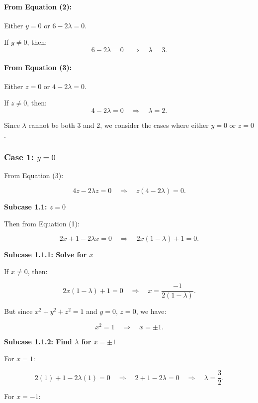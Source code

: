 \documentclass[11pt]{article}
\begin{document}
\paragraph{From Equation (2):}

Either \( y = 0 \) or \( 6 - 2\lambda = 0 \).

If \( y \neq 0 \), then:
\[
6 - 2\lambda = 0 \quad \Rightarrow \quad \lambda = 3.
\]

\paragraph{From Equation (3):}

Either \( z = 0 \) or \( 4 - 2\lambda = 0 \).

If \( z \neq 0 \), then:
\[
4 - 2\lambda = 0 \quad \Rightarrow \quad \lambda = 2.
\]

Since \( \lambda \) cannot be both 3 and 2, we consider the cases where either \( y = 0 \) or \( z = 0 \).

\newpage

\subsubsection{Case 1: \( y = 0 \)}

From Equation (3):

\[
4z - 2\lambda z = 0 \quad \Rightarrow \quad z (4 - 2\lambda) = 0.
\]

\textbf{Subcase 1.1: \( z = 0 \)}

Then from Equation (1):

\[
2x + 1 - 2\lambda x = 0 \quad \Rightarrow \quad 2x (1 - \lambda) + 1 = 0.
\]

\textbf{Subcase 1.1.1: Solve for \( x \)}

If \( x \neq 0 \), then:

\[
2x (1 - \lambda) + 1 = 0 \quad \Rightarrow \quad x = \frac{-1}{2(1 - \lambda)}.
\]

But since \( x^2 + y^2 + z^2 = 1 \) and \( y = 0 \), \( z = 0 \), we have:

\[
x^2 = 1 \quad \Rightarrow \quad x = \pm 1.
\]

\textbf{Subcase 1.1.2: Find \( \lambda \) for \( x = \pm 1 \)}

For \( x = 1 \):

\[
2(1) + 1 - 2\lambda (1) = 0 \quad \Rightarrow \quad 2 + 1 - 2\lambda = 0 \quad \Rightarrow \quad \lambda = \frac{3}{2}.
\]

For \( x = -1 \):
\end{document}
